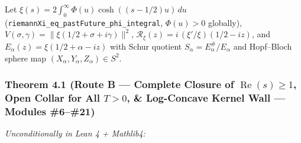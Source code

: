 \documentclass[
  11pt,
]{article}
\begin{document}
Let \(\xi(s) = 2\int_0^\infty \Phi(u)\cosh((s-1/2)u)\,du\)
(\texttt{riemannXi\_eq\_pastFuture\_phi\_integral}, \(\Phi(u) > 0\)
globally), \(V(\sigma, \gamma) = \|\xi(1/2+\sigma+i\gamma)\|^2\),
\(\mathcal{R}_\xi(z) = i\,(\xi'/\xi)(1/2-iz)\), and
\(E_\alpha(z) = \xi(1/2+\alpha-iz)\) with Schur quotient
\(S_\alpha = E_\alpha^{\#}/E_\alpha\) and Hopf--Bloch sphere map
\((X_\alpha, Y_\alpha, Z_\alpha) \in S^2\).

\subsubsection{\texorpdfstring{Theorem 4.1 (Route B --- Complete Closure
of \(\operatorname{Re}(s) \ge 1\), Open Collar for All \(T > 0\), \&
Log-Concave Kernel Wall --- Modules
\#6--\#21)}{Theorem 4.1 (Route B --- Complete Closure of \textbackslash operatorname\{Re\}(s) \textbackslash ge 1, Open Collar for All T \textgreater{} 0, \& Log-Concave Kernel Wall --- Modules \#6--\#21)}}\label{theorem-4.1-route-b-complete-closure-of-operatornameres-ge-1-open-collar-for-all-t-0-log-concave-kernel-wall-modules-621}

\emph{Unconditionally in Lean 4 + Mathlib4:}
\end{document}
